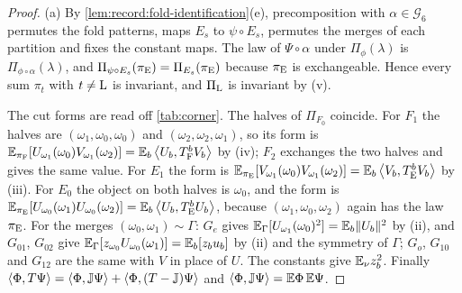 \begin{proof}
(a) By \cref{lem:record:fold-identification}(e), precomposition with
$\alpha\in\mathcal G_6$ permutes the fold patterns, maps $E_s$ to
$\psi\circ E_s$, permutes the merges of each partition and fixes the constant
maps. The law of $\Psi\circ\alpha$ under $\Pi_\phi(\lambda)$ is
$\Pi_{\phi\circ\alpha}(\lambda)$, and $\Pi_{\psi\circ E_s}(\pi_{\rm E})=
\Pi_{E_s}(\pi_{\rm E})$ because $\pi_{\rm E}$ is exchangeable. Hence every sum
$\pi_t$ with $t\ne{\rm L}$ is invariant, and $\Pi_{\rm L}$ is invariant by (v).

The cut forms are read off \cref{tab:corner}. The halves of $\Pi_{F_0}$
coincide. For $F_1$ the halves are $(\omega_1,\omega_0,\omega_0)$ and
$(\omega_2,\omega_2,\omega_1)$, so its form is
$\mathbb E_{\pi_{\rm F}}[U_{\omega_1}(\omega_0)V_{\omega_1}(\omega_2)]=\mathbb E_b\left\langle U_b,T_{\rm F}^bV_b\right\rangle$
by (iv); $F_2$ exchanges the two halves and gives the same value. For $E_1$
the form is $\mathbb E_{\pi_{\rm E}}[V_{\omega_1}(\omega_0)V_{\omega_1}(\omega_2)]=
\mathbb E_b\left\langle V_b,T_{\rm E}^bV_b\right\rangle$ by (iii). For $E_0$ the object on both halves is
$\omega_0$, and the form is $\mathbb E_{\pi_{\rm E}}[U_{\omega_0}(\omega_1)U_{\omega_0}(\omega_2)]
=\mathbb E_b\left\langle U_b,T_{\rm E}^bU_b\right\rangle$, because $(\omega_1,\omega_0,\omega_2)$ again has the
law $\pi_{\rm E}$. For the merges $(\omega_0,\omega_1)\sim\Gamma$: $G_e$ gives
$\mathbb E_\Gamma[U_{\omega_1}(\omega_0)^2]=\mathbb E_b\|U_b\|^2$ by (ii), and $G_{01}$, $G_{02}$
give $\mathbb E_\Gamma[z_{\omega_0}U_{\omega_0}(\omega_1)]=\mathbb E_b[z_bu_b]$ by (ii) and the
symmetry of $\Gamma$; $G_o$, $G_{10}$ and $G_{12}$ are the same with $V$ in
place of $U$. The constants give $\mathbb E_\nu z_b^2$. Finally
$\left\langle \Phi,T\Psi\right\rangle=\left\langle \Phi,\mathbb J\Psi\right\rangle+\left\langle \Phi,(T-\mathbb J)\Psi\right\rangle$ and
$\left\langle \Phi,\mathbb J\Psi\right\rangle=\mathbb E\Phi\,\mathbb E\Psi$.


\end{proof}
